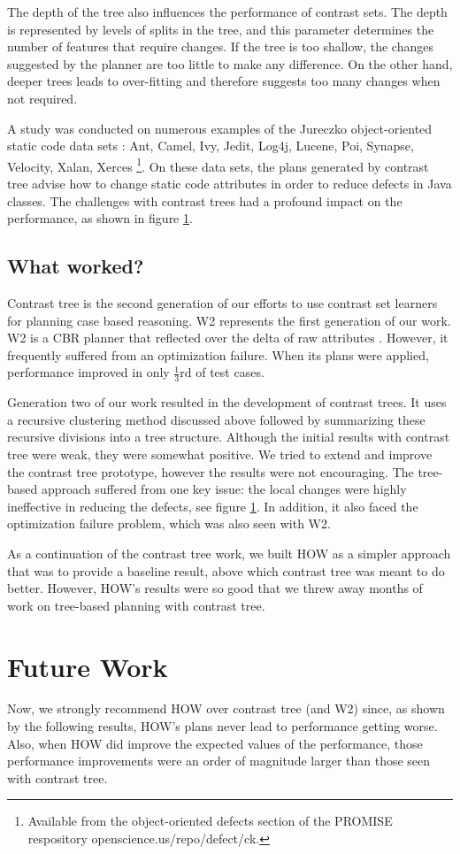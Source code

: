 \documentclass[conference]{IEEEtran}
\begin{document}
The depth of the tree also influences the performance of contrast sets. The depth is represented by levels of splits in the tree, and this parameter determines the number of features that require changes. If the tree is too shallow, the changes suggested by the planner are too little to make any difference. On the other hand, deeper trees leads to over-fitting and therefore suggests too many changes when not required.

A study was conducted on numerous examples of the Jureczko object-oriented static code data sets \cite{}: Ant, Camel, Ivy, Jedit, Log4j, Lucene, Poi, Synapse, Velocity, Xalan, Xerces \footnote{Available from the object-oriented defects section of the PROMISE respository openscience.us/repo/defect/ck.}. On these data sets, the plans generated by contrast tree advise
how to change static code attributes in order to reduce defects in Java classes. The challenges with contrast trees had a profound impact on the performance, as shown in figure \ref{}.
\subsection{What worked?}
Contrast tree is the second generation of our efforts to use contrast set learners for planning case based reasoning. W2 represents the first generation of our work. W2 is a CBR planner that reflected over the delta of raw attributes \cite{}. However, it frequently suffered from an optimization failure. When its plans were applied, performance improved in only  $\tfrac{1}{3}$rd of test cases. 

Generation two of our work resulted in the development of contrast trees. It uses a recursive clustering method discussed above followed by summarizing these recursive divisions into a tree structure. Although the initial results with contrast tree were weak, they were somewhat positive. We tried to extend and improve the contrast tree prototype, however the results were not encouraging. The tree-based approach suffered from one key issue: the local changes were highly ineffective in reducing the defects, see figure \ref{}. In addition, it also faced the optimization failure problem, which was also seen with W2. 

As a continuation of the contrast tree work, we built HOW as a simpler approach that was to provide a baseline result, above which contrast tree was meant to do better. However, HOW’s results were so good that we threw away months of work on tree-based planning with contrast tree. 
\section{Future Work}
Now, we strongly recommend HOW over contrast tree (and W2) since, as shown by the following results, HOW’s plans never lead to performance getting worse. Also, when HOW did improve the expected values of the performance, those performance improvements were an order of magnitude larger than those seen with contrast tree. 
\end{document}
